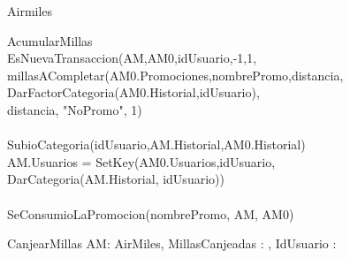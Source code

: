 \documentclass[11pt,a4paper]{article}
\newcommand{\Tipo}[1]{\mathsf{#1}}
\begin{document}
\begin{tad}{Airmiles}
\begin{proc}{AcumularMillas}
{			\\
			EsNuevaTransaccion(AM,AM0,idUsuario,-1,1,
			\\
			millasACompletar(AM0.Promociones,nombrePromo,distancia,
			\\DarFactorCategoria(AM0.Historial,idUsuario),
			\\distancia, "NoPromo", 1) \yLuego
			\\
			\\
			SubioCategoria(idUsuario,AM.Historial,AM0.Historial) \implicaLuego
			\\
			AM.Usuarios = SetKey(AM0.Usuarios,idUsuario,
			\\
			DarCategoria(AM.Historial, idUsuario)) \land
			\\
			\\
			SeConsumioLaPromocion(nombrePromo, AM, AM0)
		}
	\end{proc}

	\vspace{1cm}
	\begin{proc}{CanjearMillas}
		{\Inout AM: AirMiles, \In MillasCanjeadas : \Tipo{\R}, \In IdUsuario : \Tipo{\Z}}
		{}
	\end{proc}
	

\end{tad}
\end{document}
